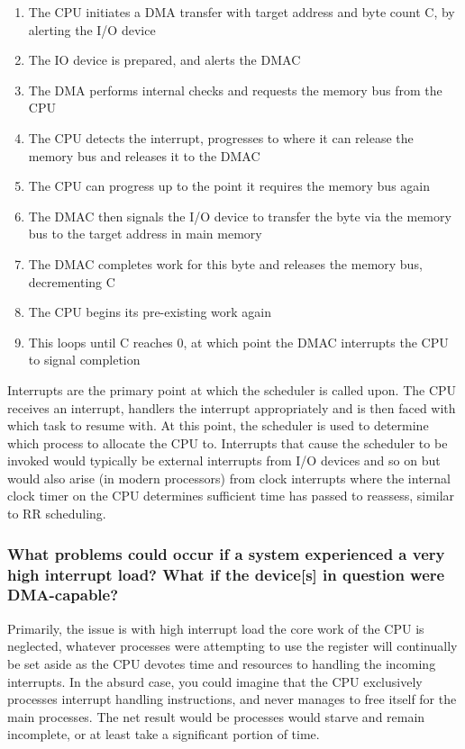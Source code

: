 \documentclass[]{article}
\begin{document}
        \begin{enumerate}
            \item The CPU initiates a DMA transfer with target address and byte count C, by alerting the I/O device
            \item The IO device is prepared, and alerts the DMAC
            \item The DMA performs internal checks and requests the memory bus from the CPU
            \item The CPU detects the interrupt, progresses to where it can release the memory bus and releases it to the DMAC
            \item The CPU can progress up to the point it requires the memory bus again
            \item The DMAC then signals the I/O device to transfer the byte via the memory bus to the target address in main memory
            \item The DMAC completes work for this byte and releases the memory bus, decrementing C
            \item The CPU begins its pre-existing work again
            \item This loops until C reaches 0, at which point the DMAC interrupts the CPU to signal completion
        \end{enumerate}

        Interrupts are the primary point at which the scheduler is called upon. The CPU receives an interrupt, handlers the interrupt appropriately and is then faced with which task to resume with. At this point, the scheduler is used to determine which process to allocate the CPU to. Interrupts that cause the scheduler to be invoked would typically be external interrupts from I/O devices and so on but would also arise (in modern processors) from clock interrupts where the internal clock timer on the CPU determines sufficient time has passed to reassess, similar to RR scheduling.


        \subsubsection{What problems could occur if a system experienced a very high interrupt load? What if the device[s] in question were DMA-capable?}

        Primarily, the issue is with high interrupt load the core work of the CPU is neglected, whatever processes were attempting to use the register will continually be set aside as the CPU devotes time and resources to handling the incoming interrupts. In the absurd case, you could imagine that the CPU exclusively processes interrupt handling instructions, and never manages to free itself for the main processes. The net result would be processes would starve and remain incomplete, or at least take a significant portion of time.
\end{document}
